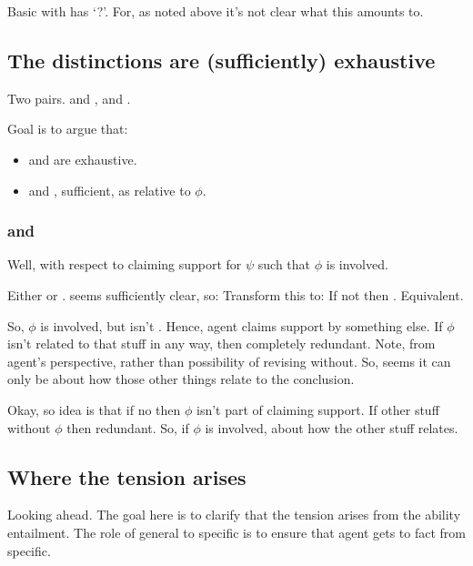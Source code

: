 \begin{note}
  Basic \AR{} with \adB{} has `?'.
  For, as noted above it's not clear what this amounts to.
\end{note}

\subsection{The distinctions are (sufficiently) exhaustive}
\label{sec:ar-wr-are}

\begin{note}
  Two pairs.
  \AR{} and \WR{}, \adA{} and \adB{}.

  Goal is to argue that:
  \begin{itemize}
  \item \AR{} and \WR{} are exhaustive.
  \item \adA{} and \adB{}, sufficient, as relative to \(\phi\).
  \end{itemize}
\end{note}



\subsubsection{\adA{} and \adB{}}

\begin{note}
  Well, with respect to claiming support for \(\psi\) such that \(\phi\) is involved.

  Either \adA{} or \adB{}.
  \adA{} seems sufficiently clear, so:
  Transform this to: If not \adA{} then \adB{}.
  Equivalent.
\end{note}

\begin{note}[Idea]
  So, \(\phi\) is involved, but isn't \adA{}.
  Hence, agent claims support by something else.
  If \(\phi\) isn't related to that stuff in any way, then completely redundant.
  Note, from agent's perspective, rather than possibility of revising without.
  So, seems it can only be about how those other things relate to the conclusion.

  Okay, so idea is that if no \adA{} then \(\phi\) isn't part of claiming support.
  If other stuff without \(\phi\) then redundant.
  So, if \(\phi\) is involved, about how the other stuff relates.
\end{note}

\subsection{Where the tension arises}
\label{sec:where-tension-arises}

\begin{note}
  {
    \color{red}
    Looking ahead.
  }
  The goal here is to clarify that the tension arises from the ability entailment.
  The role of general to specific is to ensure that agent gets to fact from specific.
\end{note}




